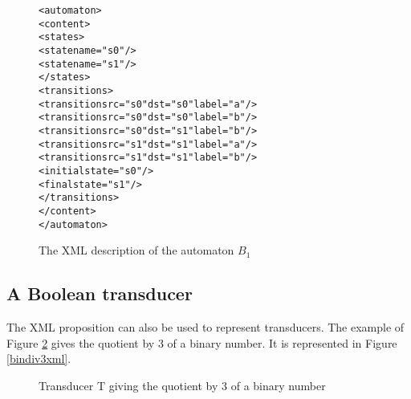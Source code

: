 \documentclass[a4paper]{llncs}
\def\dstname{\texttt{dst}}
\def\srcname{\texttt{src}}
\begin{document}
{\small

\begin{figure}[h]
  \begin{center}
\begin{alltt}
<automaton>
  <content>
    <states>
       <state name="s0"/>
       <state name="s1"/>
    </states>
    <transitions>
       <transition \srcname{}="s0" \dstname{}="s0" label="a"/>
       <transition \srcname{}="s0" \dstname{}="s0" label="b"/>
       <transition \srcname{}="s0" \dstname{}="s1" label="b"/>
       <transition \srcname{}="s1" \dstname{}="s1" label="a"/>
       <transition \srcname{}="s1" \dstname{}="s1" label="b"/>
       <initial state="s0"/>
       <final state="s1"/>
    </transitions>
  </content>
</automaton>
\end{alltt}

\caption{The XML description of the automaton $B_1$}
\label{B1xml}
  \end{center}
\end{figure}
}

\subsection{A Boolean transducer}

The XML proposition can also be used to represent transducers. The example of
Figure \ref{bindiv3} gives the quotient by 3 of a binary number. It is
represented in Figure \ref{bindiv3xml}.


\begin{figure}[h]
  \begin{center}
\caption{Transducer T giving the quotient by 3 of a binary number}
\label{bindiv3}
  \end{center}
\end{figure}
\end{document}
